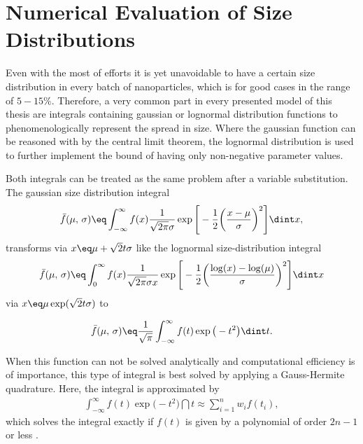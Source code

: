 \documentclass[\main/dresen_thesis.tex]{subfiles}
\begin{document}
  \section{Numerical Evaluation of Size Distributions}\label{ch:appendix:numericalMethods:sizeDistributions}
    Even with the most of efforts it is yet unavoidable to have a certain size distribution in every batch of nanoparticles, which is for good cases in the range of $5 - 15 \%$.
    Therefore, a very common part in every presented model of this thesis are integrals containing gaussian or lognormal  distribution functions to phenomenologically represent the spread in size.
    Where the gaussian function can be reasoned with by the central limit theorem, the lognormal distribution is used to further implement the bound of having only non-negative parameter values.

    Both integrals can be treated as the same problem after a variable substitution.
    The gaussian size distribution integral
    \begin{align}
    \bar{f}(\mu,\, \sigma) \eq \int_{-\infty}^\infty f(x) \frac{1}{\sqrt{2\pi} \sigma} \exp \Bigg[- \frac{1}{2} \bigg(\frac{x-\mu}{\sigma}\bigg)^2 \Bigg] \dint x,
    \end{align}
    transforms via $x \eq \mu + \sqrt{2} t \sigma$ like the lognormal size-distribution integral
    \begin{align}
    \bar{f}(\mu,\, \sigma) \eq \int_{0}^\infty f(x) \frac{1}{\sqrt{2\pi} \sigma x} \exp \Bigg[- \frac{1}{2} \bigg(\frac{\log(x)-\log(\mu)}{\sigma}\bigg)^2 \Bigg] \dint x
    \end{align}
    via $x \eq \mu \exp(\sqrt{2} t \sigma)$ to

    \begin{align}
    \bar{f}(\mu,\,\sigma) \eq \frac{1}{\sqrt{\pi}} \int_{-\infty}^\infty f(t) \exp \big(- t^2 \big) \dint t.
    \end{align}

    When this function can not be solved analytically and computational efficiency is of importance, this type of integral is best solved by applying a Gauss-Hermite quadrature.
    Here, the integral is approximated by
    \begin{align}
    \int_{-\infty}^\infty f(t) \exp \big(- t^2 \big) \dint t \approx \sum_{i=1}^{n} w_i f(t_i),
    \end{align}
    which solves the integral exactly if $f(t)$ is given by a polynomial of order $2n-1$ or less \cite{Olver_2010_Handb}.
\end{document}
